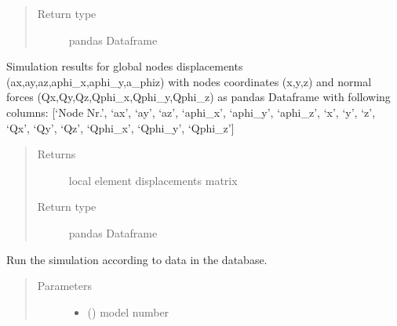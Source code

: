 \documentclass[letterpaper,10pt,english]{sphinxmanual}
\begin{document}
\begin{fulllineitems}
\begin{fulllineitems}
\begin{quote}
\begin{description}
\item[{Return type}] \leavevmode
pandas Dataframe

\end{description}\end{quote}

\end{fulllineitems}


\begin{fulllineitems}
\label{\detokenize{api:beamon.simulation.Simulation.nodes_results}}
Simulation results for global nodes displacements (ax,ay,az,aphi\_x,aphi\_y,a\_phiz) with nodes coordinates
(x,y,z) and normal forces (Qx,Qy,Qz,Qphi\_x,Qphi\_y,Qphi\_z) as pandas Dataframe with following columns:
{[}‘Node Nr.’, ‘ax’, ‘ay’, ‘az’, ‘aphi\_x’, ‘aphi\_y’, ‘aphi\_z’, ‘x’, ‘y’, ‘z’, ‘Qx’, ‘Qy’, ‘Qz’, ‘Qphi\_x’,
‘Qphi\_y’, ‘Qphi\_z’{]}
\begin{quote}\begin{description}
\item[{Returns}] \leavevmode
local element displacements matrix

\item[{Return type}] \leavevmode
pandas Dataframe

\end{description}\end{quote}

\end{fulllineitems}


\begin{fulllineitems}
\label{\detokenize{api:beamon.simulation.Simulation.simulate}}
Run the simulation according to data in the database.
\begin{quote}\begin{description}
\item[{Parameters}] \leavevmode\begin{itemize}
\item {} 
 () \textendash{} model number


\end{itemize}
\end{description}
\end{quote}
\end{fulllineitems}
\end{fulllineitems}
\end{document}
